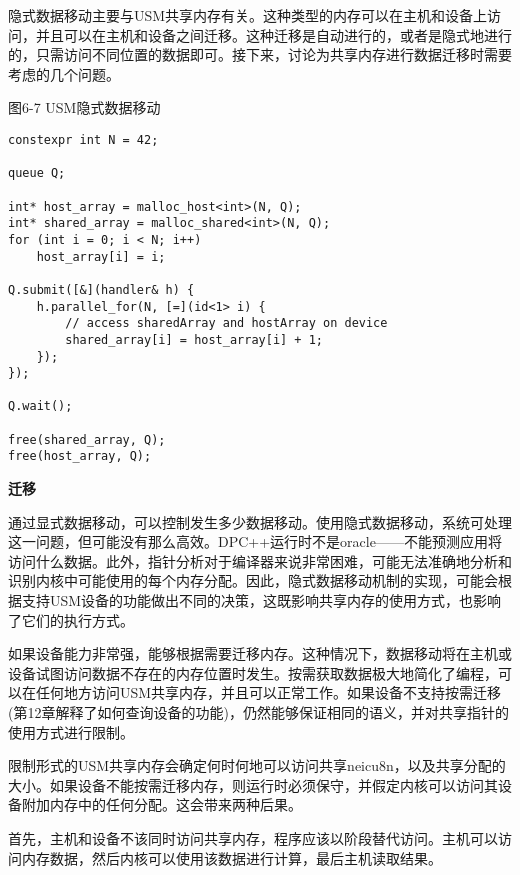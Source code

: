 隐式数据移动主要与USM共享内存有关。这种类型的内存可以在主机和设备上访问，并且可以在主机和设备之间迁移。这种迁移是自动进行的，或者是隐式地进行的，只需访问不同位置的数据即可。接下来，讨论为共享内存进行数据迁移时需要考虑的几个问题。\par

\hspace*{\fill} \par %
图6-7 USM隐式数据移动
\begin{lstlisting}[caption={}]
constexpr int N = 42;

queue Q;

int* host_array = malloc_host<int>(N, Q);
int* shared_array = malloc_shared<int>(N, Q);
for (int i = 0; i < N; i++)
	host_array[i] = i;
	
Q.submit([&](handler& h) {
	h.parallel_for(N, [=](id<1> i) {
		// access sharedArray and hostArray on device
		shared_array[i] = host_array[i] + 1;
	});
});

Q.wait();

free(shared_array, Q);
free(host_array, Q);
\end{lstlisting}

\hspace*{\fill} \par %
\textbf{迁移}

通过显式数据移动，可以控制发生多少数据移动。使用隐式数据移动，系统可处理这一问题，但可能没有那么高效。DPC++运行时不是oracle——不能预测应用将访问什么数据。此外，指针分析对于编译器来说非常困难，可能无法准确地分析和识别内核中可能使用的每个内存分配。因此，隐式数据移动机制的实现，可能会根据支持USM设备的功能做出不同的决策，这既影响共享内存的使用方式，也影响了它们的执行方式。\par

如果设备能力非常强，能够根据需要迁移内存。这种情况下，数据移动将在主机或设备试图访问数据不存在的内存位置时发生。按需获取数据极大地简化了编程，可以在任何地方访问USM共享内存，并且可以正常工作。如果设备不支持按需迁移(第12章解释了如何查询设备的功能)，仍然能够保证相同的语义，并对共享指针的使用方式进行限制。\par

限制形式的USM共享内存会确定何时何地可以访问共享neicu8n，以及共享分配的大小。如果设备不能按需迁移内存，则运行时必须保守，并假定内核可以访问其设备附加内存中的任何分配。这会带来两种后果。\par

首先，主机和设备不该同时访问共享内存，程序应该以阶段替代访问。主机可以访问内存数据，然后内核可以使用该数据进行计算，最后主机读取结果。\par

